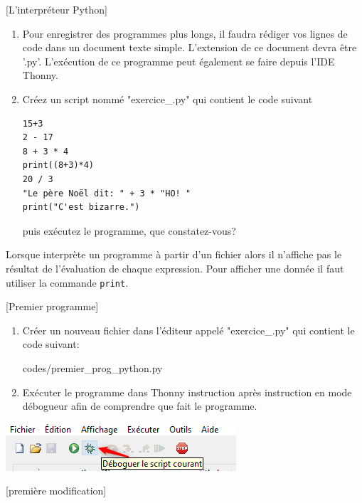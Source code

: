 \documentclass[a4paper,12pt]{article}
\begin{document}
\exo{}[L'interpréteur Python]  ~\\ 
\begin{enumerate}
	\item Pour enregistrer des programmes plus longs, il faudra rédiger vos lignes de code dans un document texte simple. L'extension de ce document devra être '.py'. L'exécution de ce programme peut également se faire depuis l'IDE Thonny.
	\item Créez un script nommé  "exercice\_\getexocompteur.py" qui contient le code suivant
	\begin{lstlisting}[numbers=none]
15+3
2 - 17 
8 + 3 * 4 
print((8+3)*4)
20 / 3
"Le père Noël dit: " + 3 * "HO! "
print("C'est bizarre.")	
	\end{lstlisting}
	puis exécutez le programme, que constatez-vous?
\end{enumerate}
\begin{eclairage}
	Lorsque \py interprète un programme à partir d'un fichier alors il n'affiche pas le résultat de l'évaluation de chaque expression. Pour afficher une donnée il faut utiliser la commande \lstinline{print}.
\end{eclairage}
\finexo
\exo{}[Premier programme]  ~\\ 
\begin{enumerate}
	\item Créer un nouveau fichier dans l'éditeur appelé "exercice\_\getexocompteur.py" qui contient le code suivant:
	
	{codes/premier_prog_python.py}
	\item Exécuter le programme dans Thonny instruction après instruction en mode débogueur afin de comprendre que fait le programme.
\end{enumerate}
\begin{center}
	\includegraphics{Thonny-debug.png}
\end{center}
\finexo
\exo{}[première modification]  ~\\ 
\end{document}
